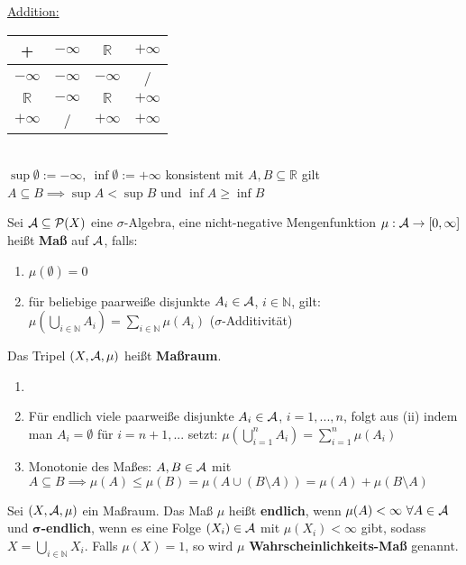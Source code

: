   \begin{notation}
    \underline{Addition:}
    \begin{tabular}[t]{c | c c c}
      + & $-\infty$ & $\mathbb{R}$ & $+\infty$\\
      \hline
      $-\infty$ & $-\infty$ & $-\infty$ & /\\
      $\mathbb{R}$ & $-\infty$ & $\mathbb{R}$ & $+\infty$\\
      $+\infty$ & / & $+\infty$ & $+\infty$
    \end{tabular}\\
    $\sup\emptyset := -\infty,\ \inf\emptyset := +\infty$ konsistent mit $A,B \subseteq \mathbb{R}$ gilt $A \subseteq B \implies \sup A < \sup B$ und $\inf A \geq \inf B$ 
  \end{notation}

  \begin{definition}
    Sei $\mathcal{A} \subseteq \mathcal{P}(X)$ eine $\sigma$-Algebra, eine nicht-negative Mengenfunktion $\mu: \mathcal{A} \rightarrow [0, \infty]$ heißt \textbf{Maß} auf $\mathcal{A}$, falls:
    \begin{enumerate}[label=(\roman*)]
      \item $\mu(\emptyset) = 0$
      \item für beliebige paarweiße disjunkte $A_i \in \mathcal{A}$, $i \in \mathbb{N}$, gilt:\\
            $\mu(\bigcup\limits_{i \in \mathbb{N}} A_i) = \sum\limits_{i \in \mathbb{N}} \mu (A_i)$ \hfill ($\sigma$-Additivität)
    \end{enumerate}
    Das Tripel $(X, \mathcal{A}, \mu)$ heißt \textbf{Maßraum}.
  \end{definition}

  \begin{remark}
    \begin{enumerate}
      \item[]
      \item Für endlich viele paarweiße disjunkte $A_i \in \mathcal{A}$, $i=1,...,n$, folgt aus (ii) indem man $A_i=\emptyset$ für $i=n+1, ...$ setzt: $\mu(\bigcup\limits_{i=1}^n A_i) = \sum\limits_{i=1}^n \mu(A_i)$
      \item Monotonie des Maßes: $A,B \in \mathcal{A}$ mit $A \subseteq B \implies \mu(A) \leq \mu(B) = \mu(A \cup (B \setminus A)) = \mu(A) + \mu(B \setminus A)$
    \end{enumerate}
  \end{remark}

  \begin{definition}
    Sei $(X, \mathcal{A}, \mu)$ ein Maßraum. Das Maß $\mu$ heißt \textbf{endlich}, wenn $\mu(A) < \infty\ \forall A \in \mathcal{A}$ und $\bm{\sigma}$\textbf{-endlich}, wenn es eine Folge $(X_i) \in \mathcal{A}$ mit $\mu(X_i) < \infty$ gibt, sodass $X=\bigcup\limits_{i \in \mathbb{N}} X_i$. Falls $\mu(X) = 1$, so wird $\mu$ \textbf{Wahrscheinlichkeits-Maß} genannt.
  \end{definition}

